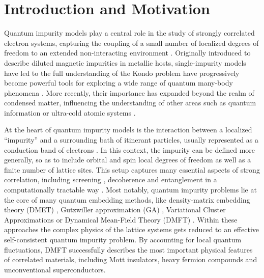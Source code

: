 \documentclass[edipack_sp.tex]{subfiles}
\begin{document}
\section{Introduction and Motivation}\label{SecIntro}
Quantum impurity models play a central role in the study of strongly correlated electron systems, capturing the coupling of a small number of localized degrees of freedom to an extended non-interacting environment \cite{Nozieres1980JP,Hewson1993}. 
Originally introduced to describe diluted magnetic impurities in metallic hosts, single-impurity models have led to the full understanding of the Kondo problem \cite{Anderson1961PR,Kondo1964POTP,Schrieffer1966PR} have progressively become powerful tools for exploring a wide range of quantum many-body phenomena \cite{Wilson1975RMP,Georges1996RMP,Kotliar2004PT,Kotliar2006RMP}. More recently, their importance has expanded beyond the realm of condensed matter, influencing the understanding of other areas such as quantum information \cite{Su2013MPLB,Walsh2019PRL,Walsh2020PQ,Walsh2021PNAS,Bellomia2024PRB} or ultra-cold atomic systems \cite{Dao2007PRL,Amaricci2014PRA,Del-Re2018PRA,Walsh2019PRB,Tusi2022NP}.


At the heart of quantum impurity models is the interaction between a localized ``impurity''  and a surrounding bath of itinerant particles, usually represented as a conduction band of electrons \cite{Hewson1993}. In this context, the  impurity  can be defined more generally, so as to include orbital and spin local degrees of freedom as well as a finite number of lattice sites. 
This setup captures many essential aspects of strong correlation, including screening \cite{Roekeghem2014PRL,Roekeghem2014EL,Werner2016JOPCM,Tomczak2017TEPJST}, decoherence and entanglement in a computationally tractable way \cite{Walsh2021PNAS,Bellomia2024PRB}.
Most notably, quantum impurity problems lie at the core of many quantum embedding methods, like density-matrix embedding theory (DMET) \cite{Knizia2012PRL}, Gutzwiller approximation (GA) \cite{Lanata2015PRX,Mejuto-Zaera2023PRB},
Variational Cluster Approximations \cite{Potthoff2003TEPJBCMACS,Senechal2008,Potthoff2011ACP,Nuss2011,Dionne2023SPC,Dionne2023SPCa}
or Dynamical Mean-Field Theory (DMFT) \cite{Georges1996RMP, Kotliar2004PT,Kotliar2006RMP}.
Within these approaches the complex physics of the lattice systems gets reduced to an effective self-consistent quantum impurity problem.
By accounting for local quantum fluctuations, DMFT successfully describes the most important physical features of correlated materials, including Mott insulators, heavy fermion compounds and unconventional superconductors.  
\end{document}
